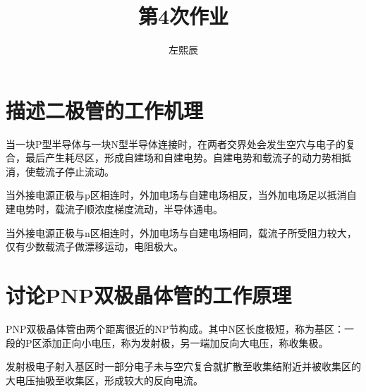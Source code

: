 \documentclass[UTF8]{ctexart}
\title{第4次作业}
\author{左熙辰}
\begin{document}
\maketitle
\section{描述二极管的工作机理}
当一块P型半导体与一块N型半导体连接时，在两者交界处会发生空穴与电子的复合，最后产生耗尽区，形成自建场和自建电势。自建电势和载流子的动力势相抵消，使载流子停止流动。

当外接电源正极与p区相连时，外加电场与自建电场相反，当外加电场足以抵消自建电势时，载流子顺浓度梯度流动，半导体通电。

当外接电源正极与n区相连时，外加电场与自建电场相同，载流子所受阻力较大，仅有少数载流子做漂移运动，电阻极大。
\section{讨论PNP双极晶体管的工作原理}
PNP双极晶体管由两个距离很近的NP节构成。其中N区长度极短，称为基区：一段的P区添加正向小电压，称为发射极，另一端加反向大电压，称收集极。

发射极电子射入基区时一部分电子未与空穴复合就扩散至收集结附近并被收集区的大电压抽吸至收集区，形成较大的反向电流。
\end{document}
